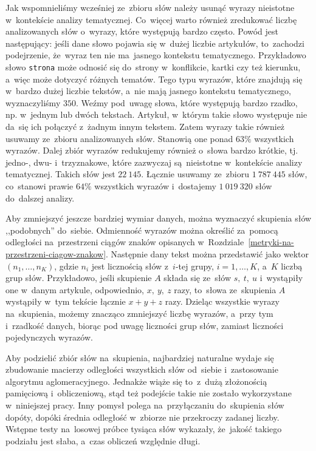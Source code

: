 \documentclass{praca1}
\begin{document}
Jak wspomnieliśmy wcześniej ze~zbioru słów należy usunąć wyrazy nieistotne w~kontekście analizy tematycznej. Co~więcej warto również zredukować liczbę analizowanych słów o~wyrazy, które występują bardzo często. Powód jest następujący: jeśli dane słowo pojawia się w~dużej liczbie artykułów, to~zachodzi podejrzenie, że~wyraz ten nie ma~jasnego kontekstu tematycznego. Przykładowo słowo \verb|strona| może odnosić się do~strony w~konflikcie, kartki czy też kierunku, a~więc może dotyczyć różnych tematów. Tego typu wyrazów, które znajdują się w~bardzo dużej liczbie tekstów, a~nie mają jasnego kontekstu tematycznego, wyznaczyliśmy $350$. Weźmy pod~uwagę słowa, które występują bardzo rzadko, np. w~jednym lub dwóch tekstach. Artykuł, w~którym takie słowo występuje nie da~się ich połączyć z~żadnym innym tekstem. Zatem wyrazy takie również usuwamy ze~zbioru analizowanych słów. Stanowią one ponad $63\%$ wszystkich wyrazów. Dalej zbiór wyrazów redukujemy również o~słowa bardzo krótkie, tj. jedno-, dwu- i~trzyznakowe, które zazwyczaj są~nieistotne w~kontekście analizy tematycznej. Takich słów jest $22\ 145$. Łącznie usuwamy ze~zbioru $1\ 787\ 445$ słów, co~stanowi prawie $64\%$ wszystkich wyrazów i~dostajemy $1\ 019\ 320$ słów do~dalszej analizy.

Aby zmniejszyć jeszcze bardziej wymiar danych, można wyznaczyć skupienia słów ,,podobnych'' do~siebie. Odmienność wyrazów można określić za~pomocą odległości na~przestrzeni ciągów znaków opisanych w~Rozdziale~\ref{metryki-na-przestrzeni-ciagow-znakow}. Następnie dany tekst można przedstawić jako wektor $(n_1, \ldots, n_K)$, gdzie $n_i$ jest licznością słów z~$i$-tej grupy, $i=1,\ldots,K$, a~$K$ liczbą grup słów. Przykładowo, jeśli skupienie $A$ składa się ze~słów $s,\ t,\ u$ i~wystąpiły one w~danym artykule, odpowiednio, $x,\ y,\ z$ razy, to~słowa ze~skupienia $A$ wystąpiły w~tym tekście łącznie $x+y+z$ razy. Dzieląc wszystkie wyrazy na~skupienia, możemy znacząco zmniejszyć liczbę wyrazów, a~przy tym i~rzadkość danych, biorąc pod uwagę liczności grup słów, zamiast liczności pojedynczych wyrazów.

Aby podzielić zbiór słów na~skupienia, najbardziej naturalne wydaje się zbudowanie macierzy odległości wszystkich słów od~siebie i~zastosowanie algorytmu aglomeracyjnego. Jednakże wiąże się to~z~dużą złożonością pamięciową i~obliczeniową, stąd też podejście takie nie zostało wykorzystane w~niniejszej pracy. Inny pomysł polega na~przyłączaniu do~skupienia słów dopóty, dopóki średnia odległość w~zbiorze nie przekroczy zadanej liczby. Wstępne testy na~losowej próbce tysiąca słów wykazały, że~jakość takiego podziału jest słaba, a~czas obliczeń względnie długi.
\end{document}
